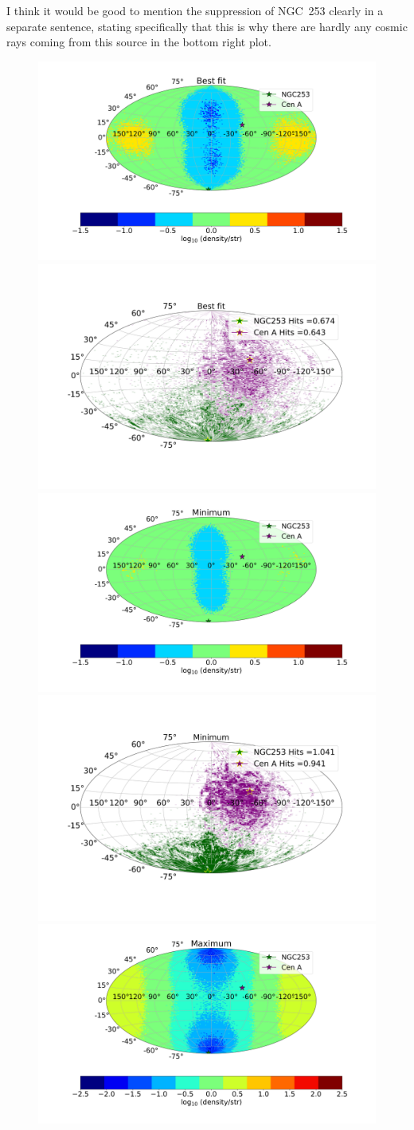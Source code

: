 \documentclass[usenatbib]{mnras}
\newcommand{\Arjen}[1]{{\color{brown}#1}}
\begin{document}
\Arjen{I think it would be good to mention the suppression of NGC~253 clearly in a separate sentence, stating specifically that this is why there are hardly any cosmic rays coming from this source in the bottom right plot.}

\begin{figure}
\centering
\includegraphics[width=0.49\linewidth]{Images/Log_Bins_180_Historgam_BF_N2_Str_Tur_TM_40_EeV.png}
\includegraphics[width=0.49\linewidth]{Images/Bins_180_BF_N2_CenA_NGC253_Str_Tur_TM_40_EeV.png}\\
\includegraphics[width=0.49\linewidth]{Images/Log_Bins_180_Historgam_LB_N2_Str_Tur_TM_40_EeV.png}
\includegraphics[width=0.49\linewidth]{Images/Bins_180_LB_N2_CenA_NGC253_Str_Tur_TM_40_EeV.png}\\
\includegraphics[width=0.49\linewidth]{Images/Log_Bins_180_Historgam_UB_N2_Str_Tur_TM_40_EeV.png}

\end{figure}
\end{document}
